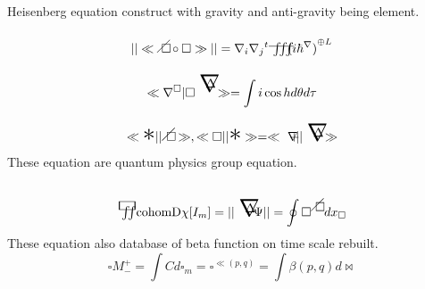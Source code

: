 \documentclass{jsarticle}
\begin{document}
Heisenberg equation construct with gravity and anti-gravity being element.
$$ ||\ll \alearletter \circ \square \gg|| = \nabla_{i}\nabla_{j}{}^{t}
\variiint{(i\hbar^{\nabla})}^{\oplus L}$$
$$ \ll \nabla^{\square} | \square^{\talot}\gg = \int i \cos hd\theta
d\tau $$
$$ \ll \scalebox{2}[2]{$\ast$} || \alearletter \gg , \ll \square ||
\scalebox{2}[2]{$\ast$}\gg = \ll \secproduct || \talot \gg $$
These equation are quantum physics group equation.
$$ \squareiint \mathrm{cohom D\chi}[I_m] = ||\talot \Psi|| = \oint \square^{
	\alearletter}dx_{\square} $$
These equation also database of beta function on time scale rebuilt.
$$ \square M^{+}_{-} = \int C d\square_{m} = \square^{\ll(p,q)} =
\int \beta(p,q)d\bowtie $$
\end{document}

